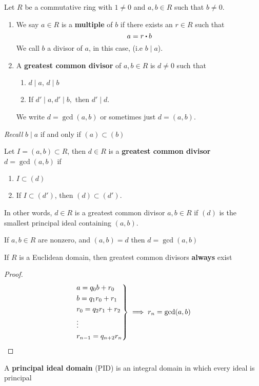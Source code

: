 \documentclass[../Main.tex]{subfiles}
\begin{document}
\begin{dfn}[title = {Multiple, GCD}]
	Let $R$ be a commutative ring with $1\ne 0$ and $a,b\in R$ such that $b\ne 0$.
	\begin{enumerate}[label=(\arabic*)]
		\item We say $a\in R$ is a \textbf{multiple} of $b$ if there exists an $r\in R$ such that
		\[a=r\rdot b\]
		We call $b$ a divisor of $a$, in this case, (i.e $b\mid a$).
		\item A \textbf{greatest common divisor} of $a,b\in R$ is $d\ne 0$ such that
		\begin{enumerate}[label=(\roman*)]
			\item $d\mid a, \, d\mid b$
			\item If $d'\mid a, d'\mid b,$ then $d'\mid d$.
		\end{enumerate}
		We write $d=\gcd(a,b)$ or sometimes just $d=(a,b)$.
	\end{enumerate}
\end{dfn}
\textit{Recall} $b\mid a$ if and only if $(a)\subset (b)$
\begin{dfn}[title = Ideal GCD]
	Let $I = (a,b)\subset R$, then $d\in R$ is a \textbf{greatest common divisor} $d=\gcd(a,b)$ if
	\begin{enumerate}
		\item $I\subset (d)$
		\item If $I\subset (d')$, then $(d)\subset (d')$.
	\end{enumerate}
	In other words, $d\in R$ is a greatest common divisor $a,b\in R$ if $(d)$ is the smallest principal ideal containing $(a,b)$.
\end{dfn}
\begin{prop}
	If $a,b\in R$ are nonzero, and $(a,b)=d$ then $d=\gcd(a,b)$
\end{prop}
\newpage
\begin{thm}[title = GCDs exist in Euclidean domains]
	If $R$ is a Euclidean domain, then greatest common divisors \textbf{always} exist
\end{thm}
\begin{proof}\[
	\begin{rcases*}
	a=q_0b+r_0\\
	b=q_1r_0+r_1\\
	r_0=q_2r_1+r_2\\
	\vdots\\
	r_{n-1}=q_{n+2}r_n
	\end{rcases*} \implies r_n = \gcd(a,b)\]
\end{proof}
\begin{dfn}[title = Principal Ideal Domain]
	A \textbf{principal ideal domain} (PID) is an integral domain in which every ideal is principal
\end{dfn}
\end{document}
